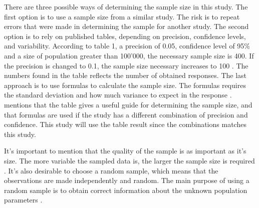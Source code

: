 There are three possible ways of determining the sample size in this study. The first option is to use a sample size from a similar study. The risk is to repeat errors that were made in determining the sample for another study. The second option is to rely on published tables, depending on precision, confidence levels, and variability. According to \cite{Israel1992} table 1, a precision of 0.05, confidence level of 95\% and a size of population greater than 100'000, the necessary sample size is 400. If the precision is changed to 0.1, the sample size necessary increases to 100 \citep{Israel1992}. The numbers found in the table reflects the number of obtained responses. The last approach is to use formulas to calculate the sample size. The formulas requires the standard deviation and how much variance to expect in the response \citep{Smith2013}\citep{Israel1992}. \cite{Israel1992} mentions that the table gives a useful guide for determining the sample size, and that formulas are used if the study has a different combination of precision and confidence. This study will use the table result since the combinations matches this study.

It's important to mention that the quality of the sample is as important as it's size. The more variable the sampled data is, the larger the sample size is required \citep{Israel1992}. It's also desirable to choose a random sample, which means that the observations are made independently and random. The main purpose of using a random sample is to obtain correct information about the unknown population parameters \citep{Walpole2012}. 



